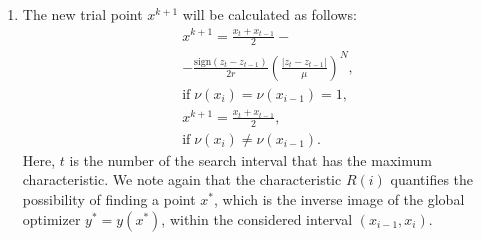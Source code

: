 \documentclass[iicol]{sn-jnl}
\theoremstyle{thmstyleone}%
\theoremstyle{thmstyletwo}%
\theoremstyle{thmstylethree}%
\begin{document}
\begin{enumerate}[1.]
\item The new trial point $x^{k+1}$ will be calculated as follows:
\begin{equation}\label{xk1_int}
\begin{aligned}
&x^{k+1}=\frac{x_t+x_{t-1}}{2}-\\
&-\frac{\mathrm{sign}(z_t-z_{t-1})}{2r}\left(\frac{\left|z_t-z_{t-1}\right|}{\mu}\right)^N,\\
&\mathrm{if} \; \nu(x_i) = \nu(x_{i-1}) = 1,\\
&x^{k+1} = \frac{x_t+x_{t-1}}{2},\\
&\mathrm{if} \; \nu(x_i) \neq \nu(x_{i-1}). \nonumber
\end{aligned}
\end{equation}
Here, $t$ is the number of the search interval that has the maximum characteristic.
We note again that the characteristic $R(i)$ quantifies the possibility of finding a point $x^*$, which is the inverse image of the global optimizer $y^* = y(x^*)$, within the considered interval $(x_{i-1},x_i)$.
\end{enumerate}
\end{document}

